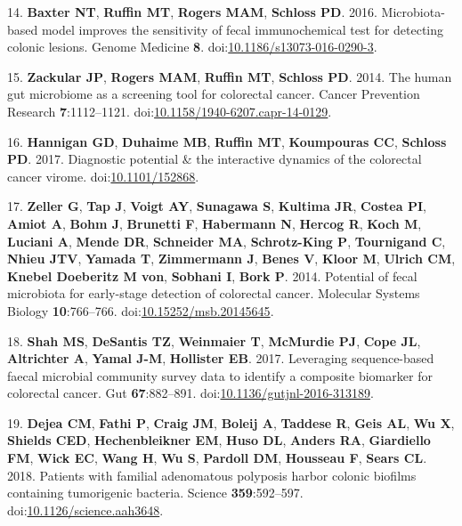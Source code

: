 \documentclass[11pt,]{article}
\begin{document}
\leavevmode\hypertarget{ref-Baxter2016}{}%
14. \textbf{Baxter NT}, \textbf{Ruffin MT}, \textbf{Rogers MAM},
\textbf{Schloss PD}. 2016. Microbiota-based model improves the
sensitivity of fecal immunochemical test for detecting colonic lesions.
Genome Medicine \textbf{8}.
doi:\href{https://doi.org/10.1186/s13073-016-0290-3}{10.1186/s13073-016-0290-3}.

\leavevmode\hypertarget{ref-Zackular2014}{}%
15. \textbf{Zackular JP}, \textbf{Rogers MAM}, \textbf{Ruffin MT},
\textbf{Schloss PD}. 2014. The human gut microbiome as a screening tool
for colorectal cancer. Cancer Prevention Research \textbf{7}:1112--1121.
doi:\href{https://doi.org/10.1158/1940-6207.capr-14-0129}{10.1158/1940-6207.capr-14-0129}.

\leavevmode\hypertarget{ref-Hannigan2017}{}%
16. \textbf{Hannigan GD}, \textbf{Duhaime MB}, \textbf{Ruffin MT},
\textbf{Koumpouras CC}, \textbf{Schloss PD}. 2017. Diagnostic potential
\& the interactive dynamics of the colorectal cancer virome.
doi:\href{https://doi.org/10.1101/152868}{10.1101/152868}.

\leavevmode\hypertarget{ref-Zeller2014}{}%
17. \textbf{Zeller G}, \textbf{Tap J}, \textbf{Voigt AY},
\textbf{Sunagawa S}, \textbf{Kultima JR}, \textbf{Costea PI},
\textbf{Amiot A}, \textbf{Bohm J}, \textbf{Brunetti F},
\textbf{Habermann N}, \textbf{Hercog R}, \textbf{Koch M},
\textbf{Luciani A}, \textbf{Mende DR}, \textbf{Schneider MA},
\textbf{Schrotz-King P}, \textbf{Tournigand C}, \textbf{Nhieu JTV},
\textbf{Yamada T}, \textbf{Zimmermann J}, \textbf{Benes V},
\textbf{Kloor M}, \textbf{Ulrich CM}, \textbf{Knebel Doeberitz M von},
\textbf{Sobhani I}, \textbf{Bork P}. 2014. Potential of fecal microbiota
for early-stage detection of colorectal cancer. Molecular Systems
Biology \textbf{10}:766--766.
doi:\href{https://doi.org/10.15252/msb.20145645}{10.15252/msb.20145645}.

\leavevmode\hypertarget{ref-Shah2017}{}%
18. \textbf{Shah MS}, \textbf{DeSantis TZ}, \textbf{Weinmaier T},
\textbf{McMurdie PJ}, \textbf{Cope JL}, \textbf{Altrichter A},
\textbf{Yamal J-M}, \textbf{Hollister EB}. 2017. Leveraging
sequence-based faecal microbial community survey data to identify a
composite biomarker for colorectal cancer. Gut \textbf{67}:882--891.
doi:\href{https://doi.org/10.1136/gutjnl-2016-313189}{10.1136/gutjnl-2016-313189}.

\leavevmode\hypertarget{ref-Dejea2018}{}%
19. \textbf{Dejea CM}, \textbf{Fathi P}, \textbf{Craig JM},
\textbf{Boleij A}, \textbf{Taddese R}, \textbf{Geis AL}, \textbf{Wu X},
\textbf{Shields CED}, \textbf{Hechenbleikner EM}, \textbf{Huso DL},
\textbf{Anders RA}, \textbf{Giardiello FM}, \textbf{Wick EC},
\textbf{Wang H}, \textbf{Wu S}, \textbf{Pardoll DM}, \textbf{Housseau
F}, \textbf{Sears CL}. 2018. Patients with familial adenomatous
polyposis harbor colonic biofilms containing tumorigenic bacteria.
Science \textbf{359}:592--597.
doi:\href{https://doi.org/10.1126/science.aah3648}{10.1126/science.aah3648}.
\end{document}
